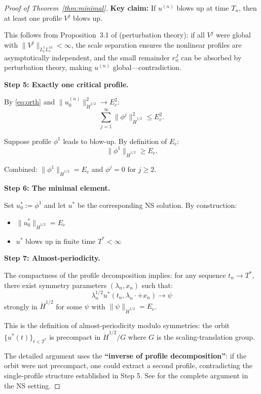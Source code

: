 \documentclass[11pt]{article}
\theoremstyle{definition}
\begin{document}
\begin{proof}[Proof of Theorem~\ref{thm:minimal}]
\textbf{Key claim:} If $u^{(n)}$ blows up at time $T_n$, then at least one profile $V^j$ blows up.

This follows from Proposition~3.1 of \cite{GKP} (perturbation theory): if all $V^j$ were global with $\|V^j\|_{L^5_t L^{10}_x} < \infty$, the scale separation ensures the nonlinear profiles are asymptotically independent, and the small remainder $r_n^J$ can be absorbed by perturbation theory, making $u^{(n)}$ global---contradiction.

\textbf{Step 5: Exactly one critical profile.}

By \eqref{eq:orth} and $\|u_0^{(n)}\|_{\dot{H}^{1/2}}^2 \to E_c^2$:
\begin{equation}
\sum_{j=1}^\infty \|\phi^j\|_{\dot{H}^{1/2}}^2 \leq E_c^2.
\end{equation}

Suppose profile $\phi^1$ leads to blow-up. By definition of $E_c$:
\begin{equation}
\|\phi^1\|_{\dot{H}^{1/2}} \geq E_c.
\end{equation}

Combined: $\|\phi^1\|_{\dot{H}^{1/2}} = E_c$ and $\phi^j = 0$ for $j \geq 2$.

\textbf{Step 6: The minimal element.}

Set $u^*_0 := \phi^1$ and let $u^*$ be the corresponding NS solution. By construction:
\begin{itemize}
\item $\|u^*_0\|_{\dot{H}^{1/2}} = E_c$
\item $u^*$ blows up in finite time $T^* < \infty$
\end{itemize}

\textbf{Step 7: Almost-periodicity.}

The compactness of the profile decomposition implies: for any sequence $t_n \to T^*$, there exist symmetry parameters $(\lambda_n, x_n)$ such that:
\begin{equation}
\lambda_n^{1/2} u^*(t_n, \lambda_n \cdot + x_n) \to \psi
\end{equation}
strongly in $\dot{H}^{1/2}$ for some $\psi$ with $\|\psi\|_{\dot{H}^{1/2}} = E_c$.

This is the definition of almost-periodicity modulo symmetries: the orbit $\{u^*(t)\}_{t < T^*}$ is precompact in $\dot{H}^{1/2}/G$ where $G$ is the scaling-translation group.

The detailed argument uses the \textbf{``inverse of profile decomposition''}: if the orbit were not precompact, one could extract a second profile, contradicting the single-profile structure established in Step 5. See \cite{GKP2016} for the complete argument in the NS setting.
\end{proof}
\end{document}
